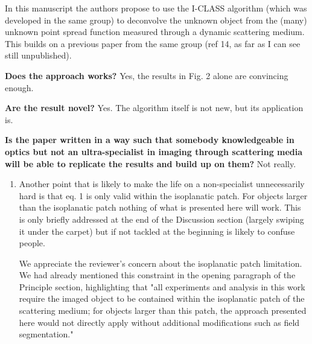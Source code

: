 \documentclass[12pt]{article}
\newenvironment{solved_reviewercomment}
    {\begin{tcolorbox}[width=\linewidth,colback=gray!5,colframe=solved_commentcolor!50,title=Reviewer Comment,left=5pt,right=5pt]}
    {\end{tcolorbox}}
\newenvironment{ourresponse}
    {\begin{tcolorbox}[width=\linewidth,breakable,enhanced,colback=gray!5,colframe=responsecolor!50,title=Response,left=5pt,right=5pt]}
    {\end{tcolorbox}}
\begin{document}
In this manuscript the authors propose to use the I-CLASS algorithm (which was developed in the same group) to deconvolve the unknown object from the (many) unknown point spread function measured through a dynamic scattering medium. This builds on a previous paper from the same group (ref 14, as far as I can see still unpublished).

\textbf{Does the approach works?} Yes, the results in Fig. 2 alone are convincing enough.

\textbf{Are the result novel?} Yes. The algorithm itself is not new, but its application is.

\textbf{Is the paper written in a way such that somebody knowledgeable in optics but not an ultra-specialist in imaging through scattering media will be able to replicate the results and build up on them?} Not really. 
\begin{enumerate}[label=\arabic*.]

    \begin{solved_reviewercomment}
        The main culprit is that the whole CRT-CLASS/I-CLASS are not well-known algorithms, and the only reference given to readers to make themselves familiar with them is not self-contained. \textbf{This has a very easy fix:} add a section in the supplementary information with an explanation of how and why the algorithm works (there is no space restriction there, so there is also no excuse to provide the necessary information).
    \end{solved_reviewercomment}
    \begin{ourresponse}
        It is the same comment as the first referee.
    \end{ourresponse}

    \item \leavevmode\vspace{-\baselineskip}
    \begin{solved_reviewercomment}
        Another point that is likely to make the life on a non-specialist unnecessarily hard is that eq. 1 is only valid within the isoplanatic patch. For objects larger than the isoplanatic patch nothing of what is presented here will work. This is only briefly addressed at the end of the Discussion section (largely swiping it under the carpet) but if not tackled at the beginning is likely to confuse people.
        
    \end{solved_reviewercomment}
    \begin{ourresponse}
        We appreciate the reviewer's concern about the isoplanatic patch limitation. We had already mentioned this constraint in the opening paragraph of the Principle section, highlighting that "all experiments and analysis in this work require the imaged object to be contained within the isoplanatic patch of the scattering medium; for objects larger than this patch, the approach presented here would not directly apply without additional modifications such as field segmentation."


\end{ourresponse}
\end{enumerate}
\end{document}
